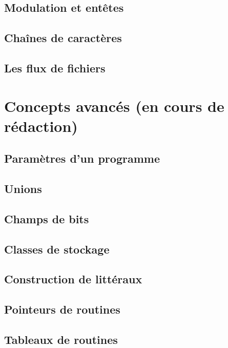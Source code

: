 \documentclass{minitelreport}
\begin{document}
\begin{refsection}
		\section{Modulation et entêtes}
		
		\section{Chaînes de caractères}
		
		\section{Les flux de fichiers}
		
	\chapter{Concepts avancés (en cours de rédaction)}
		\section{Paramètres d'un programme}
		
		\section{Unions}
		
		\section{Champs de bits}
		
		\section{Classes de stockage}
		
		\section{Construction de littéraux}
		
		\section{Pointeurs de routines}
		
		\section{Tableaux de routines}
		

\end{refsection}
\end{document}
